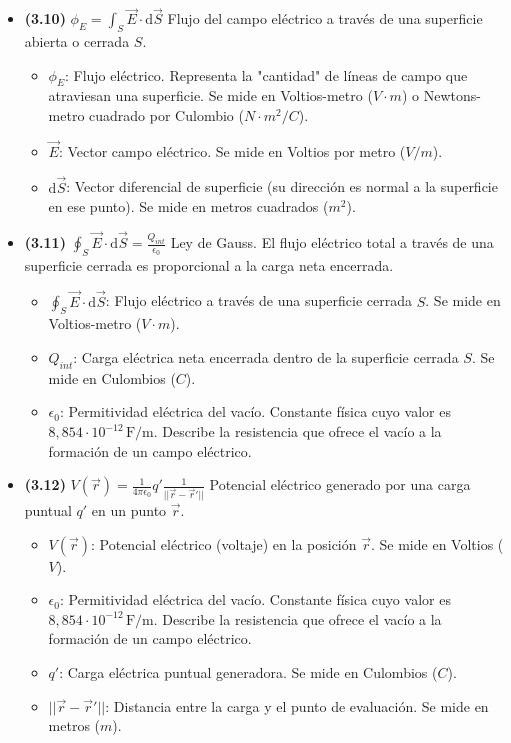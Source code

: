 \documentclass{article}
\begin{document}
\begin{itemize}
				\item \textbf{(3.10)} $\boxed{\phi_E = \int_S \vec{E} \cdot \mathrm{d}\vec{S}}$ Flujo del campo eléctrico a través de una superficie abierta o cerrada $S$.
					\begin{itemize}
						\item $\phi_E$: Flujo eléctrico. Representa la "cantidad" de líneas de campo que atraviesan una superficie. Se mide en Voltios-metro ($V\cdot m$) o Newtons-metro cuadrado por Culombio ($N\cdot m^2/C$).
						\item $\vec{E}$: Vector campo eléctrico. Se mide en Voltios por metro ($V/m$).
						\item $\mathrm{d}\vec{S}$: Vector diferencial de superficie (su dirección es normal a la superficie en ese punto). Se mide en metros cuadrados ($m^2$).
					\end{itemize}

				\item \textbf{(3.11)} $\boxed{\oint_S \vec{E} \cdot \mathrm{d}\vec{S} = \frac{Q_{int}}{\epsilon_0}}$ Ley de Gauss. El flujo eléctrico total a través de una superficie cerrada es proporcional a la carga neta encerrada.
					\begin{itemize}
						\item $\oint_S \vec{E} \cdot \mathrm{d}\vec{S}$: Flujo eléctrico a través de una superficie cerrada $S$. Se mide en Voltios-metro ($V\cdot m$).
						\item $Q_{int}$: Carga eléctrica neta encerrada dentro de la superficie cerrada $S$. Se mide en Culombios ($C$).
						\item $\epsilon_{0}$: Permitividad eléctrica del vacío. Constante física cuyo valor es $8,854\cdot10^{-12}\,\text{F/m}$. Describe la resistencia que ofrece el vacío a la formación de un campo eléctrico.
					\end{itemize}

				\item \textbf{(3.12)} $\boxed{V(\vec{r}) = \frac{1}{4\pi\epsilon_0} q' \frac{1}{\vert{}\vert{}\vec{r} - \vec{r}'\vert{}\vert{}}}$ Potencial eléctrico generado por una carga puntual $q'$ en un punto $\vec{r}$.
					\begin{itemize}
						\item $V(\vec{r})$: Potencial eléctrico (voltaje) en la posición $\vec{r}$. Se mide en Voltios ($V$).
						\item $\epsilon_{0}$: Permitividad eléctrica del vacío. Constante física cuyo valor es $8,854\cdot10^{-12}\,\text{F/m}$. Describe la resistencia que ofrece el vacío a la formación de un campo eléctrico.
						\item $q'$: Carga eléctrica puntual generadora. Se mide en Culombios ($C$).
						\item $\vert{}\vert{}\vec{r} - \vec{r}'\vert{}\vert{}$: Distancia entre la carga y el punto de evaluación. Se mide en metros ($m$).
					\end{itemize}


\end{itemize}
\end{document}
